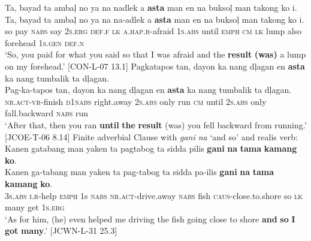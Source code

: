 \ea
Ta,  bayad  ta  ambaļ  no  ya  na  nadlek  a \textbf{asta}  man  en  na  buksoļ  man  takong  ko  i. \smallskip\\
\gll Ta,  bayad  ta  ambaļ  no  ya  na  na-adlek  a \textbf{asta}  man  en  na  buksoļ  man  takong  ko  i. \\
so  pay  \textsc{nabs}  say  2\textsc{s.erg}  \textsc{def.f}  \textsc{lk}  \textsc{a.hap.r}-afraid  1\textsc{s.abs}
until  \textsc{emph}  \textsc{cm}  \textsc{lk}  lump  also  forehead  1\textsc{s.gen}  \textsc{def.n} \\
\glt `So, you paid for what you said so that I was afraid and the \textbf{result} \textbf{(was)} a lump on my forehead.’ [CON-L-07 13.1]
\z
\ea
Pagkatapos  tan,  dayon  ka  nang  dļagan  en  \textbf{asta}  ka  nang tumbalik  ta  dļagan. \smallskip\\
\gll Pag-ka-tapos  tan,  dayon  ka  nang  dļagan  en  \textbf{asta}  ka  nang tumbalik  ta  dļagan. \\
\textsc{nr.act}-\textsc{vr}-finish  \textsc{d}1\textsc{nabs}  right.away  2\textsc{s.abs}  only  run  \textsc{cm}  until  2\textsc{s.abs}  only
fall.backward  \textsc{nabs}  run \\
\glt `After that, then you ran \textbf{until} \textbf{the} \textbf{result} (was) you fell backward from running.’ [JCOE-T-06 8.14]
\z
\ea
Finite adverbial Clause with \textit{gani na} ‘and so’ and realis verb: \\
Kanen  gatabang  man  yaken  ta  pagtabog  ta  sidda pilis  \textbf{gani}  \textbf{na}  \textbf{tama}  \textbf{kamang}  \textbf{ko}. \smallskip\\
\gll Kanen  ga-tabang  man  yaken\footnotemark{}  ta  pag-tabog  ta  sidda pa-ilis  \textbf{gani}  \textbf{na}  \textbf{tama}  \textbf{kamang}  \textbf{ko}. \\
3\textsc{s.abs}  \textsc{i.r}-help  \textsc{emph}  1s  \textsc{nabs}  \textsc{nr.act}-drive.away  \textsc{nabs}  fish \textsc{caus}-close.to.shore  so  \textsc{lk}  many  get  1\textsc{s.erg} \\
\glt ‘As for him, (he) even helped me driving the fish going close to shore \textbf{and} \textbf{so} \textbf{I} \textbf{got} \textbf{many}.’ [JCWN-L-31 25.3]
\z

